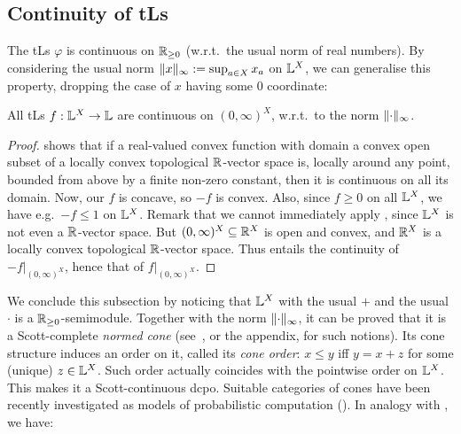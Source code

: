 \subsection{Continuity of tLs}\label{subsec:cont}%

The tLs $\varphi$ is continuous on $\mathbb{R}_{\geq0}$ (w.r.t.\ the usual norm of real numbers).
By considering the usual norm $\lVert x\rVert_\infty:=\sup_{a\in X} x_a$ on $\mathbb{L}^X$, we can generalise this property, dropping the case of $x$ having some $0$ coordinate:

\begin{theorem}\label{thm:cont}
 All tLs $f:\mathbb{L}^X\to\mathbb{L}$ are continuous on $(0,\infty)^X$, w.r.t.\ to the norm $\lVert\cdot\rVert_\infty$.
\end{theorem}
\begin{proof}
\cite[Proposition 4.4.(3)]{Cobzas2017} shows that if a real-valued convex function with domain a convex open subset of a locally convex topological $\mathbb{R}$-vector space is, locally around any point, bounded from above by a finite non-zero constant, then it is continuous on all its domain.
Now, our $f$ is concave, so $-f$ is convex.
Also, since $f\geq 0$ on all $\mathbb{L}^X$, we have e.g.\ $-f\leq 1$ on $\mathbb{L}^X$.
Remark that we cannot immediately apply \cite[Proposition 4.4.(3)]{Cobzas2017}, since $\mathbb{L}^X$ is not even a $\mathbb{R}$-vector space.
But $(0,\infty)^X\subseteq \mathbb{R}^X$ is open and convex, and $\mathbb{R}^X$ is a locally convex topological $\mathbb{R}$-vector space.
Thus \cite[Proposition 4.4.(3)]{Cobzas2017} entails the continuity of $-f\big|_{(0,\infty)^X}$, hence that of $f\big|_{(0,\infty)^X}$.
\end{proof}

We conclude this subsection by noticing that $\mathbb{L}^X$ with the usual $+$ and the usual $\cdot$ is a $\mathbb{R}_{\geq0}$-semimodule.
Together with the norm $\lVert\cdot\rVert_\infty$, it can be proved that it is a Scott-complete \emph{normed cone} (see~\cite{Selinger2004}, or the appendix, for such notions).
Its cone structure induces an order on it, called its \emph{cone order}:
$x\leq y$ iff $y=x+z$ for some (unique) $z\in\mathbb{L}^X$.
Such order actually coincides with the pointwise order on $\mathbb{L}^X$.
This makes it a Scott-continuous dcpo.
Suitable categories of cones have been recently investigated as models of probabilistic computation (\cite{Crubillie2018, EhrPagTas2018, Ehrhard2020}).
In analogy with \cite[Proposition 17]{DanEhrh2011}, we have:

